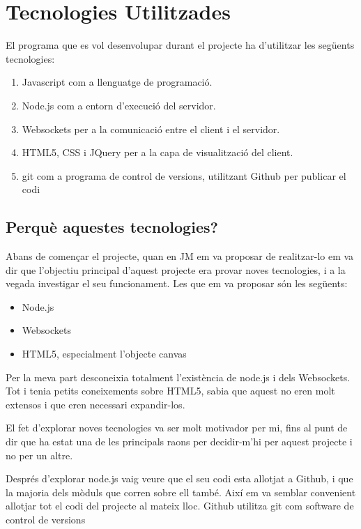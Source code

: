 \chapter{Tecnologies Utilitzades}
\label{sec:tecnologies}

El programa que es vol desenvolupar durant el projecte ha d'utilitzar les següents tecnologies: 

\begin{enumerate}
	\item{Javascript com a llenguatge de programació.}
	\item{Node.js com a entorn d'execució del servidor.}
	\item{Websockets per a la comunicació entre el client i el servidor.}
	\item{HTML5, CSS i JQuery per a la capa de visualització del client.}
	\item{git com a programa de control de versions, utilitzant Github per publicar el codi}
\end{enumerate}

\section{Perquè aquestes tecnologies?}

Abans de començar el projecte, quan en JM em va proposar de realitzar-lo em va dir que l'objectiu principal d'aquest projecte era provar noves tecnologies, i a la vegada investigar el seu funcionament. Les que em va proposar són les següents: 
\begin{itemize}
	\item{Node.js}
	\item{Websockets}
	\item{HTML5, especialment l'objecte canvas}
\end{itemize}

Per la meva part desconeixia totalment l'existència de node.js i dels Websockets. Tot i tenia petits coneixements sobre HTML5, sabia que aquest no eren molt extensos i que eren necessari expandir-los.

El fet d'explorar noves tecnologies va ser molt motivador per mi, fins al punt de dir que ha estat una de les principals raons per decidir-m'hi per aquest projecte i no per un altre.  

Després d'explorar node.js vaig veure que el seu codi esta allotjat a Github, i que la majoria dels mòduls que corren sobre ell també. Així em va semblar convenient allotjar tot el codi del projecte al mateix lloc. Github utilitza git com software de control de versions


